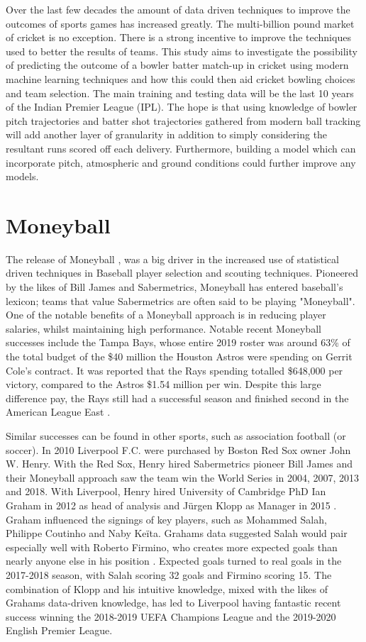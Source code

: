 \documentclass[12pt,a4paper]{report}
\theoremstyle{definition}
\begin{document}
Over the last few decades the amount of data driven techniques to improve the outcomes of sports games has increased greatly. 
The multi-billion pound market of cricket is no exception. 
There is a strong incentive to improve the techniques used to better the results of teams. 
This study aims to investigate the possibility of predicting the outcome of a bowler batter match-up in cricket using modern machine learning techniques and how this could then aid cricket bowling choices and team selection. 
The main training and testing data will be the last 10 years of the Indian Premier League (IPL).
The hope is that using knowledge of bowler pitch trajectories and batter shot trajectories gathered from modern ball tracking will add another layer of granularity in addition to simply considering the resultant runs scored off each delivery. 
Furthermore, building a model which can incorporate pitch, atmospheric and ground conditions could further improve any models. 

\section{Moneyball}

The release of Moneyball \citep{Moneyball2004}, was a big driver in the increased use of statistical driven techniques in Baseball player selection and scouting techniques. 
Pioneered by the likes of Bill James and Sabermetrics, Moneyball has entered baseball's lexicon; teams that value Sabermetrics are often said to be playing "Moneyball".  
One of the notable benefits of a Moneyball approach is in reducing player salaries, whilst maintaining high performance. 
Notable recent Moneyball successes include the Tampa Bays, whose entire 2019 roster was around 63\% of the total budget of the \$40 million the Houston Astros were spending on Gerrit Cole's contract. 
It was reported that the Rays spending totalled \$648,000 per victory, compared to the Astros \$1.54 million per win.
Despite this large difference pay, the Rays still had a successful season and finished second in the American League East \citep{Fox2019}.

Similar successes can be found in other sports, such as association football (or soccer). 
In 2010 Liverpool F.C. were purchased by Boston Red Sox owner John W. Henry. 
With the Red Sox, Henry hired Sabermetrics pioneer Bill James and their Moneyball approach saw the team win the World Series in 2004, 2007, 2013 and 2018. 
With Liverpool, Henry hired University of Cambridge PhD Ian Graham in 2012 as head of analysis and J\"urgen Klopp as Manager in 2015 \citep{Liverpool2022}. 
Graham influenced the signings of key players, such as Mohammed Salah, Philippe Coutinho and Naby Ke\"ita. 
Grahams data suggested Salah would pair especially well with Roberto Firmino, who creates more expected goals than nearly anyone else in his position \citep{Liverpool2019}. 
Expected goals turned to real goals in the 2017-2018 season, with Salah scoring 32 goals and Firmino scoring 15. 
The combination of Klopp and his intuitive knowledge, mixed with the likes of Grahams data-driven knowledge, has led to Liverpool having fantastic recent success winning the 2018-2019 UEFA Champions League and the 2019-2020 English Premier League.
\end{document}
